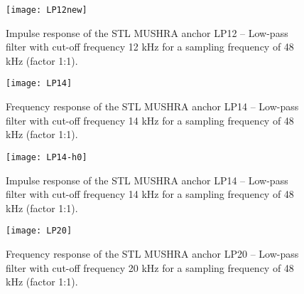 \begin{figure}[hbtp]
  \begin{center}
 \texttt{[image: LP12new]}
  \end{center}
  \caption{\SF Impulse response of the STL MUSHRA anchor LP12 -- Low-pass filter with cut-off frequency 12 kHz for a sampling frequency of 48 kHz (factor 1:1).
           \label{LP12-ir}
          }
\end{figure}


\begin{figure}[hbtp]
  \begin{center}
 \texttt{[image: LP14]}
  \end{center}
  \caption{\SF Frequency response of the STL MUSHRA anchor LP14 -- Low-pass filter with cut-off frequency 14 kHz for a sampling frequency of 48 kHz (factor 1:1).
           \label{LP14-frq}
          }
\end{figure}

\begin{figure}[hbtp]
  \begin{center}
 \texttt{[image: LP14-h0]}
  \end{center}
  \caption{\SF Impulse response of the STL MUSHRA anchor LP14 -- Low-pass filter with cut-off frequency 14 kHz for a sampling frequency of 48 kHz (factor 1:1).
           \label{LP14-ir}
          }
\end{figure}

\flushfloats

\begin{figure}[hbtp]
  \begin{center}
 \texttt{[image: LP20]}
  \end{center}
  \caption{\SF Frequency response of the STL MUSHRA anchor LP20 -- Low-pass filter with cut-off frequency 20 kHz for a sampling frequency of 48 kHz (factor 1:1).
           \label{LP20-frq}
          }
\end{figure}


